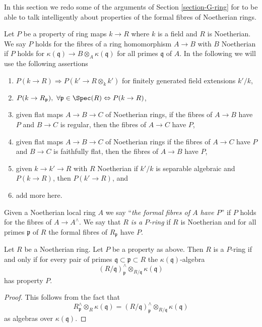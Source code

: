 \noindent
In this section we redo some of the arguments of Section \ref{section-G-ring}
for to be able to talk intelligently about
properties of the formal fibres of Noetherian rings.

\medskip\noindent
Let $P$ be a property of ring maps $k \to R$ where $k$ is a field and
$R$ is Noetherian. We say $P$ holds for the fibres of a ring homomorphism
$A \to B$ with $B$ Noetherian if $P$ holds for
$\kappa(\mathfrak q) \to B \otimes_A \kappa(\mathfrak q)$
for all primes $\mathfrak q$ of $A$.
In the following we will use the following assertions
\begin{enumerate}
\item[(A)] $P(k \to R) \Rightarrow P(k' \to R \otimes_k k')$ for
finitely generated field extensions $k'/k$,
\item[(B)] $P(k \to R_\mathfrak p),\ \forall \mathfrak p \in \Spec(R)
\Leftrightarrow P(k \to R)$,
\item[(C)] given flat maps $A \to B \to C$ of Noetherian
rings, if the fibres of $A \to B$ have $P$ and $B \to C$ is regular,
then the fibres of $A \to C$ have $P$,
\item[(D)] given flat maps $A \to B \to C$ of Noetherian
rings if the fibres of $A \to C$ have $P$ and $B \to C$ is faithfully
flat, then the fibres of $A \to B$ have $P$,
\item[(E)] given $k \to k' \to R$ with $R$ Noetherian if $k'/k$ is
separable algebraic and $P(k \to R)$, then $P(k' \to R)$, and
\item[(F)] add more here.
\end{enumerate}
Given a Noetherian local ring $A$ we say
``{\it the formal fibres of $A$ have $P$}'' if $P$ holds for
the fibres of $A \to A^\wedge$.
We say that {\it $R$ is a $P$-ring} if $R$ is Noetherian and for all
primes $\mathfrak p$ of $R$ the formal fibres of $R_\mathfrak p$ have $P$.

\begin{lemma}
\label{lemma-check-P-ring-easy}
Let $R$ be a Noetherian ring. Let $P$ be a property as above.
Then $R$ is a $P$-ring if and only if
for every pair of primes $\mathfrak q \subset \mathfrak p \subset R$
the $\kappa(\mathfrak q)$-algebra
$$
(R/\mathfrak q)_\mathfrak p^\wedge \otimes_{R/\mathfrak q} \kappa(\mathfrak q)
$$
has property $P$.
\end{lemma}

\begin{proof}
This follows from the fact that
$$
R_\mathfrak p^\wedge \otimes_R \kappa(\mathfrak q) =
(R/\mathfrak q)_\mathfrak p^\wedge \otimes_{R/\mathfrak q} \kappa(\mathfrak q)
$$
as algebras over $\kappa(\mathfrak q)$.
\end{proof}


